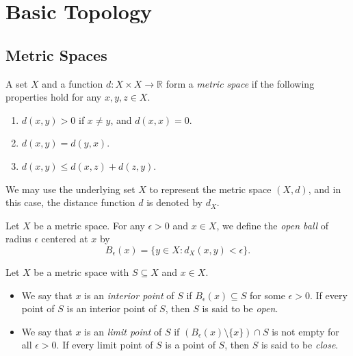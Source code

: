 \chapter{Basic Topology}
\section{Metric Spaces}
\begin{definition}
  A set $X$ and a function $d: X \times X \to \mathbb{R}$ form a \emph{metric
  space} if the following properties hold for any $x, y, z \in X$.
  \begin{enumerate}[1.]
    \item $d(x, y) > 0$ if $x \neq y$, and $d(x, x) = 0$.
    \item $d(x, y) = d(y, x)$.
    \item $d(x, y) \leq d(x, z) + d(z, y)$.
  \end{enumerate}
\end{definition}
\begin{remark}
  We may use the underlying set $X$ to represent the metric space $(X, d)$,
  and in this case, the distance function $d$ is denoted by $d_X$.
\end{remark}

\begin{definition}
  Let $X$ be a metric space.
  For any $\epsilon > 0$ and $x \in X$, we define the \emph{open ball} of
  radius $\epsilon$ centered at $x$ by
  \begin{equation*}
    B_\epsilon(x) = \{y \in X: d_X(x, y) < \epsilon\}.
  \end{equation*}
\end{definition}

\begin{definition}
  Let $X$ be a metric space with $S \subseteq X$ and $x \in X$.
  \begin{itemize}
    \item We say that $x$ is an \emph{interior point} of $S$ if
    $B_\epsilon(x) \subseteq S$ for some $\epsilon > 0$.
    If every point of $S$ is an interior point of $S$, then $S$ is said to be
    \emph{open}.
    \item We say that $x$ is an \emph{limit point} of $S$ if
    $(B_\epsilon(x) \setminus \{x\}) \cap S$ is not empty for all
    $\epsilon > 0$.
    If every limit point of $S$ is a point of $S$, then $S$ is said to be
    \emph{close}.
  \end{itemize}
\end{definition}

